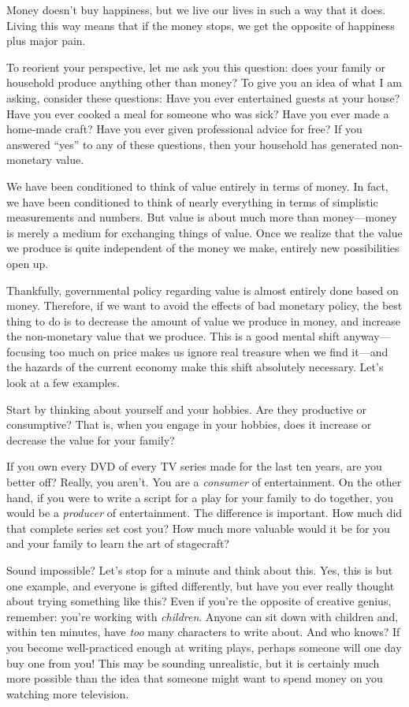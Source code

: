 Money doesn’t buy happiness, but we live our lives in such a way that
it does. Living this way means that
if the money stops,
we get the opposite of
happiness plus major pain. 

To reorient your perspective, let me ask you this question: does your
family or household produce anything other than money?  To give you an
idea of what I am asking, consider these questions: Have you ever
entertained guests at your house?  Have you ever cooked a meal for
someone who was sick?  Have you ever made a home-made craft?  Have you
ever given professional advice for free?  If you answered “yes” to any
of these questions, then your household has generated non-monetary
value. 

We have been conditioned to think of value entirely in terms of money.
In fact, we have been conditioned to think of nearly everything in
terms of simplistic measurements and numbers. But value is about much
more than money—money is merely a medium for exchanging things of
value. Once we realize that the value we produce is quite independent
of the money we make, entirely new possibilities open up.

Thankfully, governmental policy regarding value is almost entirely done
based on money. Therefore, if we want to avoid the effects of bad
monetary policy, the best thing to do is to decrease the amount of
value we produce in money, and increase the non-monetary value that we
produce. This is a good mental shift anyway—focusing too much on price
makes us ignore real treasure when we find it—and the hazards of the
current economy make this shift absolutely necessary.
Let’s look at a few
examples. 

Start by thinking about yourself and your hobbies. Are they productive
or consumptive?  That is, when you engage in your hobbies, does it
increase or decrease the value for your family? 

If you own every DVD of every TV series made for the last ten years, are
you better off?  Really, you aren’t. You are a \textit{consumer} of
entertainment. On the other hand, if you were to write a script for a
play for your family to do together, you would be a \textit{producer}
of entertainment. The difference is important. How much did that
complete series set cost you?  How much more valuable would it be for
you and your family to learn the art of stagecraft? 

Sound impossible? Let’s
stop for a minute and think about this. Yes, this is but one example,
and everyone is gifted differently, but have you ever really thought
about trying something like this? Even if you’re the opposite of
creative genius, remember: you’re working with
\textit{children}.
Anyone can sit down with children and, within ten minutes, have
\textit{too}
many characters to write about. And who knows? If you become
well-practiced enough at writing plays, perhaps someone will one day
buy one from you!  This may be sounding unrealistic, but it is
certainly much more possible than the idea that someone might want to
spend money on you watching more television.

